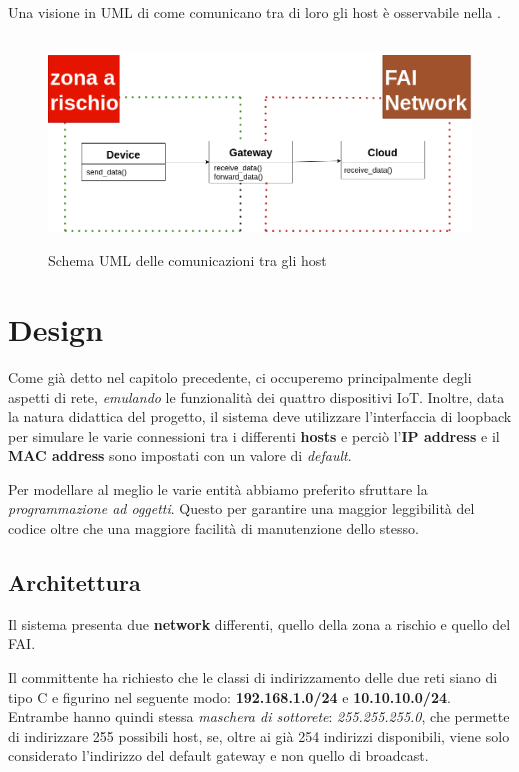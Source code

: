 \documentclass[a4paper,12pt]{report}
\begin{document}
Una visione in UML di come comunicano tra di loro gli host è osservabile nella .
\newline
\newline
\begin{figure}
\centering{}
\includegraphics[width=\textwidth, height=15em]{img/AnalysisUML.png}
\caption{Schema UML delle comunicazioni tra gli host}
\label{img:analysis}
\end{figure}

\chapter{Design}
Come già detto nel capitolo precedente, ci occuperemo principalmente degli aspetti di rete, \emph{emulando} le funzionalità dei quattro dispositivi IoT.
%
Inoltre, data la natura didattica del progetto, il sistema deve utilizzare l'interfaccia di loopback per simulare le varie connessioni tra i differenti \textbf{hosts} e perciò l'\textbf{IP address} e il \textbf{MAC address} sono impostati con un valore di \emph{default}.

Per modellare al meglio le varie entità abbiamo preferito sfruttare la \emph{programmazione ad oggetti}.
%
Questo per garantire una maggior leggibilità del codice oltre che una maggiore facilità di manutenzione dello stesso.

\section{Architettura}

Il sistema presenta due \textbf{network} differenti, quello della zona a rischio e quello del FAI.

Il committente ha richiesto che le classi di indirizzamento delle due reti siano di tipo C e figurino nel seguente modo: \textbf{192.168.1.0/24} e \textbf{10.10.10.0/24}. 
%
Entrambe hanno quindi stessa \emph{maschera di sottorete}: \emph{255.255.255.0}, che permette di indirizzare 255 possibili host, se, oltre ai già 254 indirizzi disponibili, viene solo considerato l'indirizzo del default gateway e non quello di broadcast.
\end{document}
